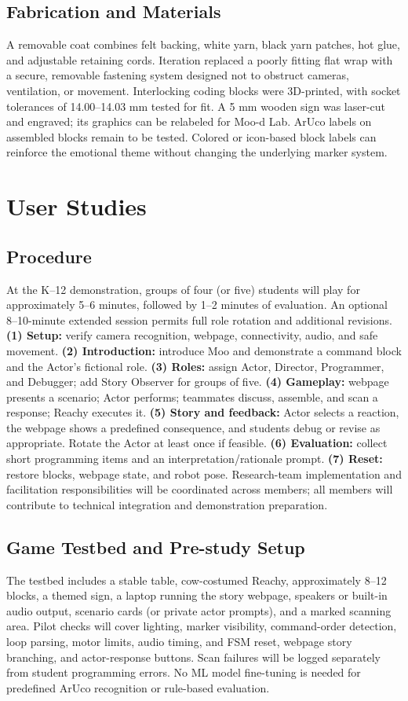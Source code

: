 \documentclass[conference,12pt,letterpaper]{IEEEtran}
\begin{document}
\subsection{Fabrication and Materials}
A removable coat combines felt backing, white yarn, black yarn patches, hot glue, and adjustable retaining cords. Iteration replaced a poorly fitting flat wrap with a secure, removable fastening system designed not to obstruct cameras, ventilation, or movement. Interlocking coding blocks were 3D-printed, with socket tolerances of 14.00--14.03 mm tested for fit. A 5 mm wooden sign was laser-cut and engraved; its graphics can be relabeled for Moo-d Lab. ArUco labels on assembled blocks remain to be tested. Colored or icon-based block labels can reinforce the emotional theme without changing the underlying marker system.

\section{User Studies}
\subsection{Procedure}
At the K--12 demonstration, groups of four (or five) students will play for approximately 5--6 minutes, followed by 1--2 minutes of evaluation. An optional 8--10-minute extended session permits full role rotation and additional revisions. \textbf{(1) Setup:} verify camera recognition, webpage, connectivity, audio, and safe movement. \textbf{(2) Introduction:} introduce Moo and demonstrate a command block and the Actor's fictional role. \textbf{(3) Roles:} assign Actor, Director, Programmer, and Debugger; add Story Observer for groups of five. \textbf{(4) Gameplay:} webpage presents a scenario; Actor performs; teammates discuss, assemble, and scan a response; Reachy executes it. \textbf{(5) Story and feedback:} Actor selects a reaction, the webpage shows a predefined consequence, and students debug or revise as appropriate. Rotate the Actor at least once if feasible. \textbf{(6) Evaluation:} collect short programming items and an interpretation/rationale prompt. \textbf{(7) Reset:} restore blocks, webpage state, and robot pose. Research-team implementation and facilitation responsibilities will be coordinated across members; all members will contribute to technical integration and demonstration preparation.

\subsection{Game Testbed and Pre-study Setup}
The testbed includes a stable table, cow-costumed Reachy, approximately 8--12 blocks, a themed sign, a laptop running the story webpage, speakers or built-in audio output, scenario cards (or private actor prompts), and a marked scanning area. Pilot checks will cover lighting, marker visibility, command-order detection, loop parsing, motor limits, audio timing, and FSM reset, webpage story branching, and actor-response buttons. Scan failures will be logged separately from student programming errors. No ML model fine-tuning is needed for predefined ArUco recognition or rule-based evaluation.
\end{document}
